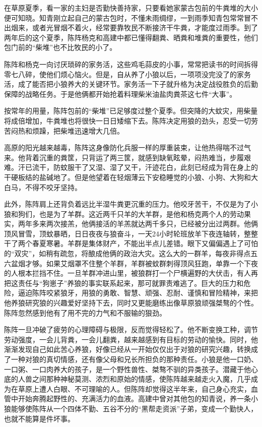 \par 在草原夏季，看一家的主妇是否勤快善持家，只要看她家蒙古包前的牛粪堆的大小便可知晓。知青刚立起自己的蒙古包时，不懂未雨绸缪，一到雨季知青包常常冒不出烟来，或者光冒烟不着火，经常要靠牧民不断接济干牛粪，才能度过雨季。到了两年后的这个夏季，陈阵杨克和高建中都已懂得翻粪、晒粪和堆粪的重要性，他们包门前的“柴堆”也不比牧民的小了。
\par 陈阵和杨克一向讨厌琐碎的家务活，这些鸡毛蒜皮的小事，常常把读书的时间拆得零七八碎，使他们烦心恼火。但是，自从养了小狼以后，一项项没完没了的家务活，成了能否把小狼养大的关键环节。家务活一下子就升格为决定战役胜负的后勤保障的战略任务。于是他俩都开始抢着料理柴米油盐肉粪茶这七件“大事”。
\par 按常年的用量，陈阵包前的“柴堆”已足够度过整个夏季。但突降的大蚊灾，用柴量将成倍增加，牛粪堆也将很快一日日矮缩下去。陈阵决定用狼的劲头，忍受一切劳苦闷热和烦躁，把柴堆迅速增大几倍。
\par 高原的阳光越来越毒，陈阵这身像防化兵服一样的厚重装束，让他热得喘不过气来。他背着沉重的粪筐，只背运了两三筐，就感到缺氧眩晕，闷热难当，步履艰难。汗已流干，防蚊服干了又湿、湿了又干，汗迹花白，此刻已经成为背在身上的干硬板结的盐碱地了。但是他望着在轻烟薄云下安稳睡觉的小狼、小狗、大狗和大白马，不得不咬牙坚持。
\par 此外，陈阵肩上还背负着远比半湿牛粪更沉重的压力。他咬牙苦干，不仅是为了小狼和狗们，也是为了羊群。这近两千只羊的大羊群，是他和杨克两个人的劳动果实，两年多来两次接羔，他俩接活的羊羔就达两千多只，已经被分出过两群。他俩顶风冒雪，顶蚊暴晒，日日夜夜与狼奋斗，一天24小时轮班放羊下夜连轴转，整整干了两个春夏寒暑。羊群是集体财产，不能出半点儿差错。眼下又偏偏遇上了可怕的“双灾”，如稍有疏忽，将酿成他俩的政治大灾。这么大的一群羊，每夜非得点五六盆烟才够。如果艾烟罩不住整个羊群，羊群被蚊群刺得顶风狂跑，单靠一个下夜的人根本拦挡不住。一旦羊群冲进山里，被狼群打一个尸横遍野的大伏击，有人再把这责任与“狗崽子”养狼的事实联系起来，那可就罪责难逃了。巨大的压力和危险，逼迫陈阵咬紧狼牙，用狼的勇敢、智慧、顽强、忍耐、谨慎和冒险精神，来把他养狼研究狼的兴趣爱好坚持下去，同时又更能磨练出像草原狼顽强桀骜的个性。陈阵忽然感到他有了用不完的力气和不服输的狠劲。
\par 陈阵一旦冲破了疲劳的心理障碍与极限，反而觉得轻松了。他不断变换工种，调节劳动强度，一会儿背粪，一会儿翻粪，越来越感到有目标的劳动的愉快。同时，他渐渐发现自己如此苦心养狼，好像已经从一开始仅仅出于对狼的研究兴趣，转换成了一种对狼的真切情感，还有像父母和兄长所担负的那种责任。小狼是他一口奶、一口粥、一口肉养大的孩子，是一个野性兽性、桀骜不驯的异类孩子。潜藏于他心底的人兽之间那种神秘莫测、浓烈和原始的情感，使陈阵越来越走火入魔，几乎成为在草原上遭人白眼、不可理喻的人。但陈阵却觉得这半年来，自己身心充实，血管中开始奔腾起野性的、充满活力的血液。高建中曾对其他包的知青说，养一条小狼能够使陈阵从一个四体不勤、五谷不分的“黑帮走资派”子弟，变成一个勤快人，也就不能算是件坏事。
